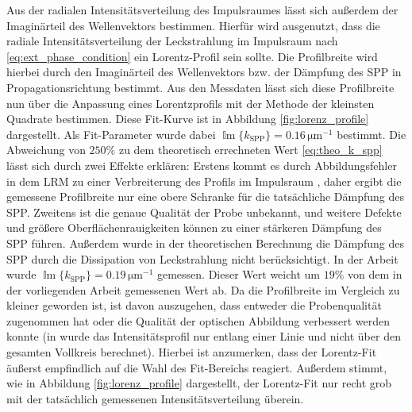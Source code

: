 \documentclass[titlepage,  ngerman]{article}
\renewcommand{\Im}{\operatorname{\mathbb{I}m}}
\begin{document}
	Aus der radialen Intensitätsverteilung des Impulsraumes lässt sich außerdem der Imaginärteil des Wellenvektors bestimmen. Hierfür  wird ausgenutzt, dass die radiale Intensitätsverteilung der Leckstrahlung im Impulsraum nach \eqref{eq:ext_phase_condition} ein Lorentz-Profil sein sollte. Die Profilbreite wird hierbei durch den Imaginärteil des Wellenvektors bzw. der Dämpfung des SPP in Propagationsrichtung bestimmt. Aus den Messdaten lässt sich diese Profilbreite nun über die Anpassung eines Lorentzprofils mit der Methode der kleinsten Quadrate bestimmen. Diese Fit-Kurve ist in Abbildung \ref{fig:lorenz_profile} dargestellt. Als Fit-Parameter wurde dabei $\Im\{k_\mathrm{SPP}\} = 0.16\,\mathrm{\mu m}^{-1}$ bestimmt. Die Abweichung von $250\%$ zu dem theoretisch errechneten Wert \ref{eq:theo_k_spp} lässt sich durch zwei Effekte erklären: Erstens kommt es durch Abbildungsfehler in dem LRM zu einer Verbreiterung des Profils im Impulsraum \cite{Jaruschewski.2020}, daher ergibt die gemessene Profilbreite nur eine obere Schranke für die tatsächliche Dämpfung des SPP. Zweitens ist die genaue Qualität der Probe unbekannt, und weitere Defekte und größere Oberflächenrauigkeiten können zu einer stärkeren Dämpfung des SPP führen. Außerdem wurde in der theoretischen Berechnung die Dämpfung des SPP durch die Dissipation von Leckstrahlung nicht berücksichtigt. In der Arbeit \cite{Jaruschewski.2020} wurde  $\Im\{k_\mathrm{SPP}\} = 0.19\,\mathrm{\mu m}^{-1}$ gemessen. Dieser Wert weicht um $19\%$ von dem in der vorliegenden Arbeit gemessenen Wert ab. Da die Profilbreite im Vergleich zu \cite{Jaruschewski.2020} kleiner geworden ist, ist davon auszugehen, dass entweder die Probenqualität zugenommen hat oder die Qualität der optischen Abbildung verbessert werden konnte (in \cite{Jaruschewski.2020} wurde das Intensitätsprofil nur entlang einer Linie und nicht über den gesamten Vollkreis berechnet). Hierbei ist anzumerken, dass der Lorentz-Fit äußerst empfindlich auf die Wahl des Fit-Bereichs reagiert. Außerdem stimmt, wie in Abbildung \ref{fig:lorenz_profile} dargestellt, der Lorentz-Fit nur recht grob mit der tatsächlich gemessenen Intensitätsverteilung überein.
	\FloatBarrier
\end{document}
